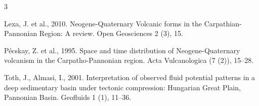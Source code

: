 \documentclass[11.5pt,twoside]{report}
\newenvironment{localsize}[1] %
{%
	\clearpage
	\let\orignewcommand\newcommand
	\let\newcommand\renewcommand
	\makeatletter
	\makeatother
	\let\newcommand\orignewcommand
}
{%
	\clearpage
}
\begin{document}
\begin{multicols}{3}
\begin{localsize}{10}
Lexa, J. et al., 2010. Neogene-Quaternary Volcanic forms in the Carpathian-Pannonian Region: A review. Open Geosciences 2 (3), 15.

Pécskay, Z. et al., 1995. Space and time distribution of Neogene-Quaternary volcanism in the Carpatho-Pannonian region. Acta Vulcanologica (7 (2)), 15–28.

Toth, J., Almasi, I., 2001. Interpretation of observed fluid potential patterns in a deep sedimentary basin under tectonic compression: Hungarian Great Plain, Pannonian Basin. Geofluids 1 (1), 11–36.

\end{localsize}

\end{multicols}
\end{document}
